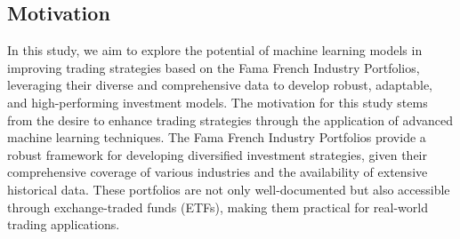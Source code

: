 \documentclass{article}
\begin{document}





\subsection{Motivation}

In this study, we aim to explore the potential of machine learning models in improving trading strategies based on the Fama French Industry Portfolios, leveraging their diverse and comprehensive data to develop robust, adaptable, and high-performing investment models. The motivation for this study stems from the desire to enhance trading strategies through the application of advanced machine learning techniques. The Fama French Industry Portfolios provide a robust framework for developing diversified investment strategies, given their comprehensive coverage of various industries and the availability of extensive historical data. These portfolios are not only well-documented but also accessible through exchange-traded funds (ETFs), making them practical for real-world trading applications.
\end{document}
